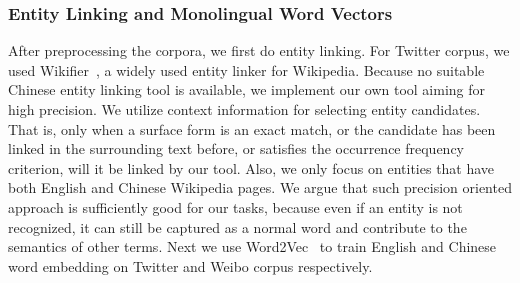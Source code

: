 \subsubsection{Entity Linking and Monolingual Word Vectors}
After preprocessing the corpora, we first do entity linking.
For Twitter corpus, we used Wikifier~\cite{ChengRo13,ratinov2011local}, a widely used
entity linker for Wikipedia. 
Because no suitable Chinese entity linking tool is available, we implement our own tool aiming for high precision. 
We utilize context information for selecting entity candidates. 
That is, only when a surface form is an exact match, or the candidate has been 
linked in the surrounding text before, or satisfies the occurrence 
frequency criterion, will it be linked by our tool. Also, we only focus on entities that have both English and Chinese 
Wikipedia pages.
We argue that such precision oriented approach is sufficiently good for our tasks, 
because even if an entity is not recognized, it can still be captured as a normal
word and contribute to the semantics of other terms.
%
%
Next we use Word2Vec~\cite{Mikolov2013distributed} to train English and Chinese word embedding on Twitter and Weibo corpus respectively.

